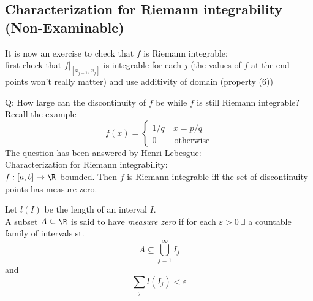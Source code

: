 \subsection{Characterization for Riemann integrability (Non-Examinable)}
\begin{note}
It is now an exercise to check that $f$ is Riemann integrable:\\
first check that $f|_{[x_{j-1},x_j]}$ is integrable for each $j$ (the values of $f$ at the end points won't really matter) and use additivity of domain (property (6))
\end{note}
\begin{note}
Q: How large can the discontinuity of $f$ be while $f$ is still Riemann integrable?\\
Recall the example
\[f(x) = \begin{cases} 1/q &\ x = p/q\\ 0 &\text{ otherwise}\end{cases}\]
The question has been answered by Henri Lebesgue:\\
Characterization for Riemann integrability:\\
$f:[a,b]\to \R$ bounded. Then $f$ is Riemann integrable iff the set of discontinuity points has measure zero.
\end{note}
\begin{definition}
Let $l(I)$ be the length of an interval $I$.\\
A subset $A\subseteq \R$ is said to have \emph{measure zero} if for each $\varepsilon > 0 \ \exists$ a countable family of intervals st.
\[A\subseteq \bigcup_{j=1}^{\infty} I_j\]
and
\[\sum_j l(I_j) < \varepsilon\]
\end{definition}
